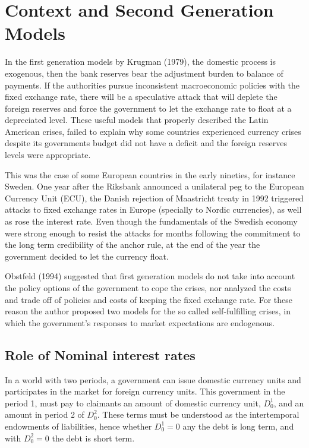 \documentclass[a4paper,12pt]{article}
\begin{document}
\section{Context and Second Generation Models}
In the first generation models by Krugman (1979), the domestic process is exogenous, then the bank reserves bear the adjustment burden to balance of payments. If the authorities pursue inconsistent macroeconomic policies with the fixed exchange rate, there will be a speculative attack that will deplete the foreign reserves and force the government to let the exchange rate to float at a depreciated level. These useful models that properly described the Latin American crises, failed to explain why some countries experienced currency crises despite its governments budget did not have a deficit and the foreign reserves levels were appropriate. 

This was the case of some European countries in the early nineties, for instance Sweden. One year after the Riksbank announced a unilateral peg to the European Currency Unit (ECU), the Danish rejection of Maastricht treaty in 1992 triggered attacks to fixed exchange rates in Europe (specially to Nordic currencies), as well as rose the interest rate. Even though the fundamentals of the Swedish economy were strong enough to resist the attacks for months following the commitment to the long term credibility of the anchor rule, at the end of the year the government decided to let the currency float.

Obstfeld (1994) suggested that first generation models do not take into account the policy options of the government to cope the crises, nor analyzed the costs and trade off of policies and costs of keeping the fixed exchange rate. For these reason the author proposed two models for the so called self-fulfilling crises, in which the government’s responses to market expectations are endogenous.

\subsection{Role of Nominal interest rates}

In a world with two periods, a government can issue domestic currency units and participates in the market for foreign currency units. This government in the period 1, must pay to claimants an amount of domestic currency unit, $D_0^1$, and an amount in period 2 of $D_0^2$. These terms must be understood as the intertemporal endowments of liabilities, hence whether $D_0^1=0$  any the debt is long term, and with $D_0^2=0$ the debt is short term. 
\end{document}
